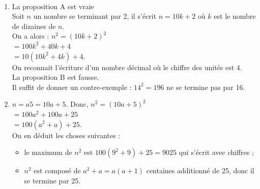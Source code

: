 \begin{corrige}
\ \\ [-5mm]
   \begin{enumerate}
      \item 
      {\blue La proposition A est vraie} \\
         Soit $n$ un nombre se terminant par 2, il s'écrit $n=10k+2$ où $k$ est le nombre de dizaines de $n$. \\
         On a alors : $n^2 =(10k+2)^2$ \\
         \hspace*{2.1cm} $=100k^2+40k+4$ \\
         \hspace*{2.1cm} $=10(10k^2+4k)+4$. \\
         On reconnait l'écriture d'un nombre décimal où le chiffre des unités est 4. \\      
      {\blue La proposition B est fausse.} \\
       Il suffit de donner un contre-exemple : $14^2=196$ ne se termine pas par 16. \\
      \item $n =\overline{a5} =10a+5$. Donc, $n^2=(10a+5)^2$ \\
      \hspace*{4.35cm} $=100a^2+100a+25$ \\
      \hspace*{4.35cm} $ =100(a^2+a)+25$. \\
      On en déduit les choses suivantes :
      \begin{itemize}
         \item le maximum de $n^2$ est $100(9^2+9)+25 =9025$ qui s'écrit avec { chiffres} ; \\
         \item $n^2$ est composé de $a^2+a =${\blue $a(a+1)$} centaines additionné de 25, donc {\blue il se termine par 25}. \\
      \end{itemize}
   \end{enumerate}
\end{corrige}


\bigskip


